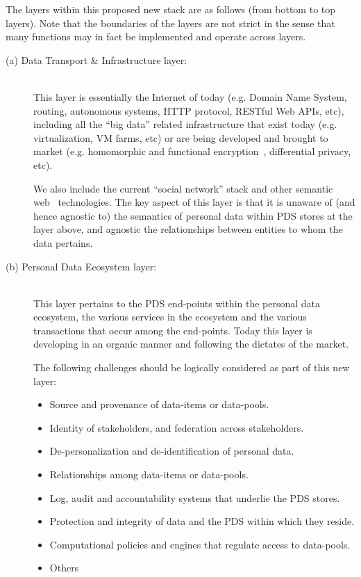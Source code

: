 The layers within this proposed new stack
are as follows (from bottom to top layers).
Note that the boundaries of the layers
are not strict in the sense that many
functions may in fact be implemented and operate across layers.
\begin{description}


\item[(a) Data Transport \& Infrastructure layer:]~\\
This layer is essentially the Internet of today
(e.g. Domain Name System, routing, autonomous systems, 
HTTP protocol, RESTful Web APIs, etc),
including all the ``big data'' related infrastructure
that exist today (e.g. virtualization, VM farms, etc)
or are being developed and brought to market
(e.g. homomorphic and functional encryption~\cite{BonehSahai2011},
differential privacy, etc).

We also include the current ``social network'' stack and
other semantic web~\cite{BernersLee1999} technologies.
The key aspect of this layer is that it is unaware of
(and hence agnostic to)
the semantics of personal data within PDS stores at the layer above,
and agnostic the relationships between entities to whom the data pertains.


\item[(b) Personal Data Ecosystem layer:]~\\
This layer pertains to the PDS end-points
within the personal data ecosystem,
the various services in the ecosystem and
the various transactions that occur among the end-points.
Today this layer is developing in an organic manner
and following the dictates of the market.

The following challenges should be logically
considered as part of this new layer:
\begin{itemize}
\item  Source and provenance of data-items or data-pools.
\item  Identity of stakeholders, and federation across stakeholders.
\item  De-personalization and de-identification of personal data.
\item  Relationships among data-items or data-pools.
\item  Log, audit and accountability systems that underlie the PDS stores.
\item  Protection and integrity of data and the PDS within which they reside.
\item  Computational policies and engines that regulate access
to data-pools.
\item  Others
\end{itemize}




\end{description}
